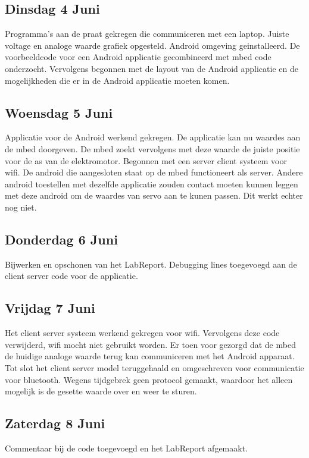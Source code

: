 \documentclass[a4paper]{article}
\begin{document}
		\subsection{Dinsdag 4 Juni}
			Programma's aan de praat gekregen die communiceren met een laptop. Juiste voltage en analoge waarde grafiek opgesteld. Android omgeving geinstalleerd. De voorbeeldcode voor een Android applicatie gecombineerd met mbed code onderzocht. Vervolgens begonnen met de layout van de Android applicatie en de mogelijkheden die er in de Android applicatie moeten komen.
		\subsection{Woensdag 5 Juni}
			Applicatie voor de Android werkend gekregen. De applicatie kan nu waardes aan de mbed doorgeven. De mbed zoekt vervolgens met deze waarde de juiste positie voor de as van de elektromotor. Begonnen met een server client systeem voor wifi. De android die aangesloten staat op de mbed functioneert als server. Andere android toestellen met dezelfde applicatie zouden contact moeten kunnen leggen met deze android om de waardes van servo aan te kunen passen. Dit werkt echter nog niet.
		\subsection{Donderdag 6 Juni}
			Bijwerken en opschonen van het LabReport. Debugging lines toegevoegd aan de client server code voor de applicatie.
		\subsection{Vrijdag 7 Juni}
			Het client server systeem werkend gekregen voor wifi. Vervolgens deze code verwijderd, wifi mocht niet gebruikt worden. Er toen voor gezorgd dat de mbed de huidige analoge waarde terug kan communiceren met het Android apparaat. Tot slot het client server model teruggehaald en omgeschreven voor communicatie voor bluetooth. Wegens tijdgebrek geen protocol gemaakt, waardoor het alleen mogelijk is de gesette waarde over en weer te sturen.
		\subsection{Zaterdag 8 Juni}
			Commentaar bij de code toegevoegd en het LabReport afgemaakt.
	
\end{document}
